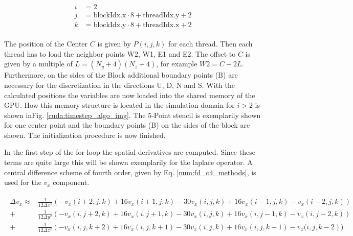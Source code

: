 \begin{align}
    \begin{split}
    i &= 2\\
    j &= \text{blockIdx.x}\cdot 8 + \text{threadIdx.y} + 2\\
    k &= \text{blockIdx.y}\cdot 8 + \text{threadIdx.x} + 2
    \end{split}
\end{align}

The position of the Center $C$ is given by $P(i, j, k)$ for each thread.
Then each thread has to load the neighbor points W2, W1, E1 and E2.
The offset to $C$ is given by a multiple of ${L=(N_y+4)(N_z+4)}$, for example ${W2= C - 2L}$.
Furthermore, on the sides of the Block additional boundary points (B) are necessary for the discretization
in the directions U, D, N and S.
With the calculated positions the variables are now loaded into the shared memory of the GPU.
How this memory structure is located in the simulation domain  for $i>2$ is shown inFig. \ref{cuda:timestep_algo_img}.
The 5-Point stencil is exemplarily shown for one center point and the boundary points (B) on the sides of the block are shown.
The initialization procedure is now finished.

In the first step of the for-loop the spatial derivatives are computed.
Since these terms are quite large this will be shown exemplarily for the laplace operator.
A central difference scheme of fourth order, given by Eq. \ref{num:fd_o4_methods}, is used for the $v_x$ component.

\begin{align}
    \begin{split}
    \Delta v_x   \approx &  \frac{1}{12\Delta x^2} \left(-v_x(i+2, j, k) + 16v_x(i+1, j, k) - 30v_x(i, j, k) + 16v_x(i-1, j, k)-v_x(i-2, j, k)\right)\\
                              +&  \frac{1}{12\Delta y^2} \left(-v_x(i, j+2, k) + 16v_x(i, j+1, k) - 30v_x(i, j, k) + 16v_x(i, j-1, k)-v_x(i, j-2, k)\right)\\
                              +&  \frac{1}{12\Delta z^2} \left(-v_x(i, j, k+2) + 16v_x(i, j, k+1) - 30v_x(i, j, k) + 16v_x(i, j, k-1)-v_x(i, j, k-2\right))
    \end{split}
\end{align}

